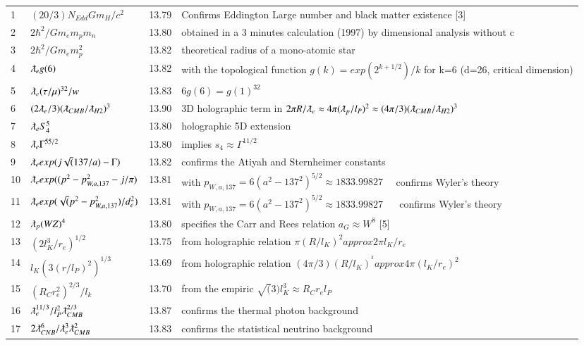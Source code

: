 \documentclass[a4paper,9pt]{article}
\begin{document}
\begin{appendix}
\begin{table}
\begin{tabular}{llll}
    
    1 & $(20/3)N_{Edd}Gm_H/c^2$ & 13.79 & Confirms Eddington Large number and black matter existence [3] \\
    2 & $2\hbar^2/Gm_em_pm_n$ & 13.80 & obtained in a 3 minutes calculation (1997) by dimensional analysis without c \\
    3 & $2\hbar^2/Gm_em_p^2$ & 13.82 & theoretical radius of a mono-atomic star \\
    4 & $\lambdabar_{e} g(6)$ & 13.82 & with the topological function $g(k)=exp(2^{k+1/2})/k$ for k=6 (d=26, critical dimension) \\
    5 & $\lambdabar_{e} (\tau/\mu)^{32}/w$ & 13.83 & $6g(6) = g(1)^{32}$\\     
    6 & $(2\lambdabar_{e}/3)(\lambdabar_{CMB}/\lambdabar_{H2})^3$ & 13.90 & 3D holographic term in $2\pi R/\lambdabar_{e} \approx 4\pi (\lambdabar_{p}/l_P)^2 \approx (4\pi /3) (\lambdabar_{CMB}/\lambdabar_{H2})^3$ \\
    7 & $\lambdabar_{e} S_4^5$ & 13.80 & holographic 5D extension \\
    8 & $\lambdabar_{e} \Gamma^{55/2}$ & 13.80 & implies $s_4 \approx \Gamma^{11/2}$ \\
    9 & $\lambdabar_{e} exp(j\sqrt (137/a) - \Gamma)$ & 13.82 &confirms the Atiyah and Sternheimer constants \\ 
    10 & $\lambdabar_{e} exp((p^2-p_{W,a,137}^2 - j/\pi)$ & 13.81 & with $p_{W,a,137} = 6(a^2 - 137^2)^{5/2} \approx 1833.99827$~~ confirms Wyler's theory\\ 
    11 & $\lambdabar_{e} exp(\sqrt (p^2-p_{W,a,137}^2)/d_e^2)$ & 13.81 & with $p_{W,a,137} = 6(a^2 - 137^2)^{5/2} \approx 1833.99827$ ~~ confirms Wyler's theory\\ 
    12 & $\lambdabar_{p} {(WZ)}^{4}$ & 13.80 & specifies the Carr and Rees relation $a_G \approx W^8$ [5] \\
    13 &  $(2l_K^3/r_e)^{1/2}$ & 13.75 & from holographic relation $\pi(R/l_K)^2 approx 2\pi l_K/r_e$  \\
    14 &  $l_K(3(r/l_P)^2)^{1/3}$ & 13.69 & from holographic relation $(4\pi/3) (R/l_K)^^3  approx 4\pi (l_K/r_e)^2$ \\
    15 &  $(R_{C}r_e^2)^{2/3}/l_k$ & 13.70 & from the empiric $\sqrt(3) l_K^3  \approx R_{C}r_el_P$ \\
    16 & $\lambdabar_{e} ^{11/3}/l_P^2 \lambdabar_{CMB}^{2/3}$ & 13.87 & confirms the thermal photon background \\
    17 & $2\lambdabar_{CNB}^6/\lambdabar_e ^3 \lambdabar_{CMB}^2$ & 13.83 & confirms the statistical neutrino background \\

\end{tabular}
\end{table}
\end{appendix}
\end{document}
